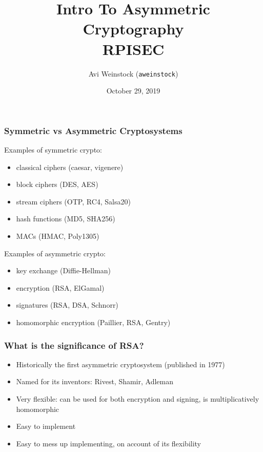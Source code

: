 \documentclass[aspectratio=169]{beamer}
\title{Intro To Asymmetric Cryptography\\RPISEC}
\date{October 29, 2019}
\author{Avi Weinstock (\Verb|aweinstock|)}
\begin{document}
\maketitle


\begin{frame}[fragile]
\frametitle{Symmetric vs Asymmetric Cryptosystems}
\begin{minipage}[t]{0.45\textwidth}
Examples of symmetric crypto:
\begin{itemize}
\item classical ciphers (caesar, vigenere)
\item block ciphers (DES, AES)
\item stream ciphers (OTP, RC4, Salsa20)
\item hash functions (MD5, SHA256)
\item MACs (HMAC, Poly1305)
\end{itemize}
\end{minipage}
\begin{minipage}[t]{0.5\textwidth}
Examples of asymmetric crypto:
\begin{itemize}
\item key exchange (Diffie-Hellman)
\item encryption (RSA, ElGamal)
\item signatures (RSA, DSA, Schnorr)
\item homomorphic encryption (Paillier, RSA, Gentry)
\end{itemize}
\end{minipage}
\end{frame}

\begin{frame}[fragile]
\frametitle{What is the significance of RSA?}
\begin{itemize}
\item Historically the first asymmetric cryptosystem (published in 1977)
\item Named for its inventors: Rivest, Shamir, Adleman
\item Very flexible: can be used for both encryption and signing, is multiplicatively homomorphic
\item Easy to implement
\item Easy to mess up implementing, on account of its flexibility
\end{itemize}
\end{frame}
\end{document}
